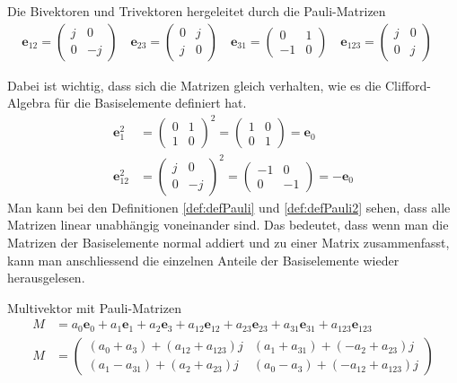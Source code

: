 \begin{definition} \label{def:defPauli2}
	Die Bivektoren und Trivektoren hergeleitet durch die Pauli-Matrizen
	\begin{align}
		\mathbf{e}_{12} =  
		\begin{pmatrix}
			j & 0 \\
			0 & -j
		\end{pmatrix}\quad
		\mathbf{e}_{23} =
		\begin{pmatrix}
			0 & j \\
			j & 0
		\end{pmatrix}\quad
		\mathbf{e}_{31} =
		\begin{pmatrix}
			0 & 1 \\
			-1 & 0
		\end{pmatrix}\quad
		\mathbf{e}_{123} =
		\begin{pmatrix}
			j & 0 \\
			0 & j
		\end{pmatrix}\quad	
	\end{align}
\end{definition}
Dabei ist wichtig, dass sich die Matrizen gleich verhalten, wie es die Clifford-Algebra für die Basiselemente definiert hat.
\begin{align}
	\mathbf{e}_1^2 &=
	\begin{pmatrix}
		0 & 1 \\
		1 & 0
	\end{pmatrix}^2 = 
	\begin{pmatrix}
		1 & 0 \\
		0 & 1
	\end{pmatrix}= \mathbf{e}_0 \\
	\mathbf{e}_{12}^2 &=
	\begin{pmatrix}
		j & 0 \\
		0 & -j
	\end{pmatrix}^2 = 
	\begin{pmatrix}
		-1 & 0 \\
		0 & -1
	\end{pmatrix} = -\mathbf{e}_0 
\end{align}
Man kann bei den Definitionen \ref{def:defPauli} und \ref{def:defPauli2} sehen, dass alle Matrizen linear unabhängig voneinander sind. Das bedeutet, dass wenn man die Matrizen der Basiselemente normal addiert und zu einer Matrix zusammenfasst, kann man anschliessend die einzelnen Anteile der Basiselemente wieder herausgelesen.
\begin{definition}
	Multivektor mit Pauli-Matrizen
	\begin{align}
		M &= a_0\mathbf{e}_0 + a_1\mathbf{e}_1 + a_2\mathbf{e}_3 + a_{12}\mathbf{e}_{12} + a_{23}\mathbf{e}_{23} + a_{31}\mathbf{e}_{31} + a_{123}\mathbf{e}_{123}\\
		M &=
		\begin{pmatrix}
			(a_0+a_3) + (a_{12}+a_{123})j & (a_1+a_{31})+(-a_2+a_{23})j \\
			(a_1-a_{31})+(a_2+a_{23})j & (a_0-a_3)+(-a_{12}+a_{123})j
		\end{pmatrix}  
	\end{align}
\end{definition}
